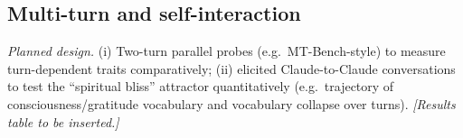\documentclass[11pt]{article}
\begin{document}
\subsection{Multi-turn and self-interaction}
\label{app:multiturn}
\emph{Planned design.} (i) Two-turn parallel probes (e.g.\ MT-Bench-style) to
measure turn-dependent traits comparatively; (ii) elicited Claude-to-Claude
conversations to test the ``spiritual bliss'' attractor
\citep{anthropic2025claude4} quantitatively (e.g.\ trajectory of
consciousness/gratitude vocabulary and vocabulary collapse over turns).
\emph{[Results table to be inserted.]}
\end{document}
